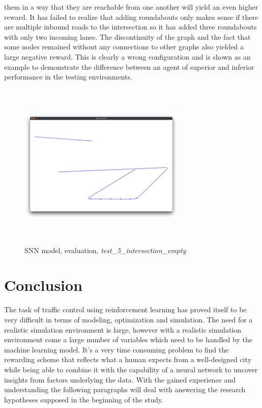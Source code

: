 \documentclass[
]{elteikthesis}[2023/04/10]
\begin{document}
\begin{enumerate}
them in a way that they are reachable from one another will yield
an even higher reward. It has failed to realize that adding roundabouts
only makes sense if there are multiple inbound roads to the intersection
so it has added three roundabouts with only two incoming lanes. The
discontinuity of the graph and the fact that some nodes remained without
any connections to other graphs also yielded a large negative reward.
This is clearly a wrong configuration and is shown as an example to
demonstrate the difference between an agent of superior and inferior
performance in the testing environments. 
\begin{figure}[H]
\begin{centering}
\includegraphics[width=8cm,height=8cm,keepaspectratio]{images/city_agent_snn_2023-05-04_20-30_test_5_intersection_empty}
\par\end{centering}
\caption{SNN model, evaluation, \emph{test\_5\_intersection\_empty}}
\end{figure}
\end{enumerate}
\newpage{}

\chapter{Conclusion}

The task of traffic control using reinforcement learning has proved
itself to be very difficult in terms of modeling, optimization and
simulation. The need for a realistic simulation environment is large,
however with a realistic simulation environment come a large number
of variables which need to be handled by the machine learning model.
It's a very time consuming problem to find the rewarding scheme that
reflects what a human expects from a well-designed city while being
able to combine it with the capability of a neural network to uncover
insights from factors underlying the data. With the gained experience
and understanding the following paragraphs will deal with answering
the research hypotheses supposed in the beginning of the study. 
\end{document}
